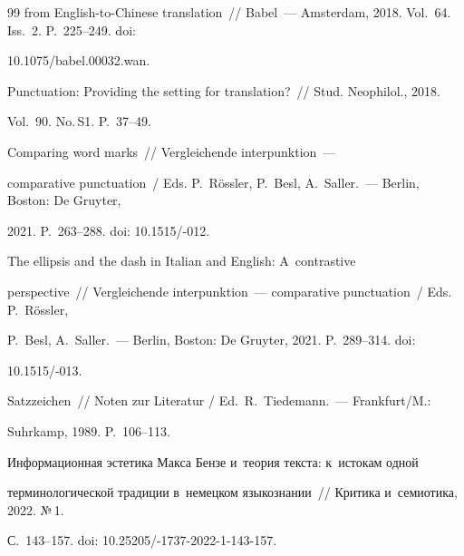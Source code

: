 {{\begin{thebibliography}{99}
from English-to-Chinese translation~/\!\!/ Babel~--- Amsterdam, 2018. Vol.~64. Iss.~2. P.~225--249. doi: 


10.1075\!/\!babel.00032.wan.







 Punctuation: Providing the setting for translation?~/\!\!/ Stud. Neophilol., 2018. 


Vol.~90. No.\,S1. P.~37--49.







 Comparing word marks~/\!\!/ Vergleichende interpunktion~--- 


comparative punctuation~/ Eds. P.~R\"{o}ssler, P.~Besl, A.~Saller.~--- Berlin, Boston: De Gruyter, 


2021. P.~263--288. doi: 10.1515\!/-012.







 The ellipsis and the dash in Italian and English: A~contrastive 


perspective~/\!\!/ Vergleichende interpunktion~--- comparative punctuation~/ Eds. P.~R\"{o}ssler, 


P.~Besl, A.~Saller.~--- Berlin, Boston: De Gruyter, 2021. P.~289--314. doi: 


10.1515\!/-013.







 Satzzeichen~/\!\!/ Noten zur Literatur / Ed.\ R.~Tiedemann.~--- Frankfurt/M.: 


Suhrkamp, 1989. P.~106--113.




 Информационная эстетика Макса Бензе и~теория текста: к~истокам одной 


терминологической традиции в~немецком языкознании~/\!\!/ Критика и~семиотика, 2022. №\,1. 


С.~143--157. doi: 10.25205\!/-1737-2022-1-143-157.








\end{thebibliography}}}
